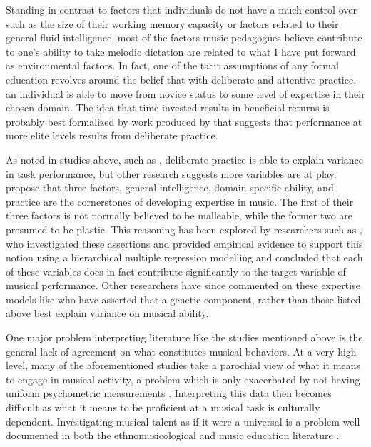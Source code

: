 \documentclass[12pt,]{book}
\begin{document}
Standing in contrast to factors that individuals do not have a much control over such as the size of their working memory capacity or factors related to their general fluid intelligence, most of the factors music pedagogues believe contribute to one's ability to take melodic dictation are related to what I have put forward as environmental factors.
In fact, one of the tacit assumptions of any formal education revolves around the belief that with deliberate and attentive practice, an individual is able to move from novice status to some level of expertise in their chosen domain.
The idea that time invested results in beneficial returns is probably best formalized by work produced by \citet{ericssonRoleDeliberatePractice1993} that suggests that performance at more elite levels results from deliberate practice.

As noted in studies above, such as \citet{meinzDeliberatePracticeNecessary2010}, deliberate practice is able to explain variance in task performance, but other research suggests more variables are at play.
\citet{dettermanMoreComprehensiveTheory1999} propose that three factors, general intelligence, domain specific ability, and practice are the cornerstones of developing expertise in music.
The first of their three factors is not normally believed to be malleable, while the former two are presumed to be plastic.
This reasoning has been explored by researchers such as \citet{ruthsatzBecomingExpertMusical2008}, who investigated these assertions and provided empirical evidence to support this notion using a hierarchical multiple regression modelling and concluded that each of these variables does in fact contribute significantly to the target variable of musical performance.
Other researchers have since commented on these expertise models like \citet{mosingPracticeDoesNot2014} who have asserted that a genetic component, rather than those listed above best explain variance on musical ability.

One major problem interpreting literature like the studies mentioned above is the general lack of agreement on what constitutes musical behaviors.
At a very high level, many of the aforementioned studies take a parochial view of what it means to engage in musical activity, a problem which is only exacerbated by not having uniform psychometric measurements \citep{bakerExaminingMusicalSophistication2018a, talaminiMusiciansHaveBetter2017}.
Interpreting this data then becomes difficult as what it means to be proficient at a musical task is culturally dependent.
Investigating musical talent as if it were a universal is a problem well documented in both the ethnomusicological and music education literature \citep{blackingHowMusicalMan2000, murphyHowFarTests1999}.
\end{document}
